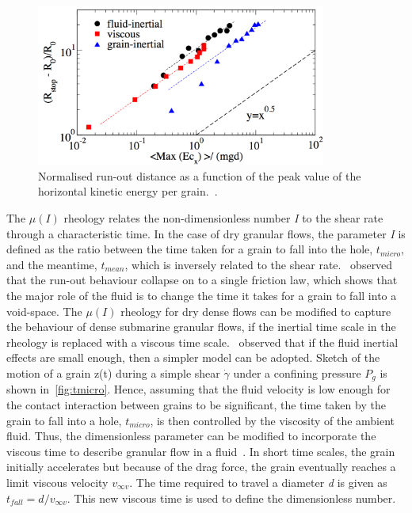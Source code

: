 \begin{figure}[htbp]
\centering
\includegraphics[width=0.85\textwidth]{Ekx_Run}
\caption{Normalised run-out distance as a function of
the peak value of the horizontal kinetic energy per grain.~\citep{Topin2011}.}
\label{fig:Ekx_Run}
\end{figure}


The $\mu(\textit{I})$ rheology relates the non-dimensionless number \textit{I} 
to the shear rate through a characteristic time. In the case of dry granular 
flows, the parameter \textit{I} is defined as the ratio between the time taken 
for a grain to fall into the hole, $\textit{t}_{\textit{micro}}$, and the 
meantime, $\textit{t}_{\textit{mean}}$, which is inversely related to the shear 
rate.~\citet{Cassar2005} observed that the run-out behaviour collapse on to a 
single friction law, which shows that the major role of the fluid is to change 
the time it takes for a grain to fall into a void-space. 
The $\mu(\textit{I})$ rheology for dry dense flows can be modified to capture 
the behaviour of dense submarine granular flows, if the inertial time scale in 
the rheology is replaced with a viscous time scale.~\citet{Pitman2005} observed 
that if the fluid inertial effects are small enough, then a simpler model can 
be adopted. Sketch of the motion of a grain z(t) during a simple shear 
$\dot{\gamma}$ under a confining pressure $P_g$ is 
shown in~\cref{fig:tmicro}. Hence, assuming that the fluid 
velocity is low enough for the contact interaction between grains to be 
significant, the time taken by the grain to fall into a hole, 
$\textit{t}_{\textit{micro}}$, is  then controlled by the viscosity of the 
ambient fluid. Thus, the dimensionless parameter can be modified to incorporate 
the viscous time to describe granular flow in a fluid~\citep{Pouliquen2005}. In 
short time scales, the grain initially accelerates but because of the drag 
force, the grain eventually reaches a limit viscous velocity $v_{\infty v}$. 
The time required to travel a diameter \textit{d} is given as $t_{fall} = d / 
v_{\infty v}$. This new viscous time is used to define the dimensionless number.

